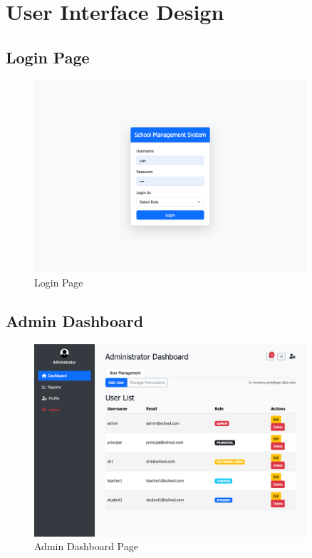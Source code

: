\documentclass[12pt,a4paper]{report}
\begin{document}
\chapter{User Interface Design}
\section{Login Page}
\begin{figure}[htbp]
    \centering
    \includegraphics[width=0.9\textwidth]{login-page.png}
    \caption{Login Page}
    \label{fig:login-page}
\end{figure}

\section{Admin Dashboard}
\begin{figure}[htbp]
    \centering
    \includegraphics[width=0.9\textwidth]{admin-dashboard-page.png}
    \caption{Admin Dashboard Page}
    \label{fig:admin-dashboard-page}
\end{figure}
\end{document}
